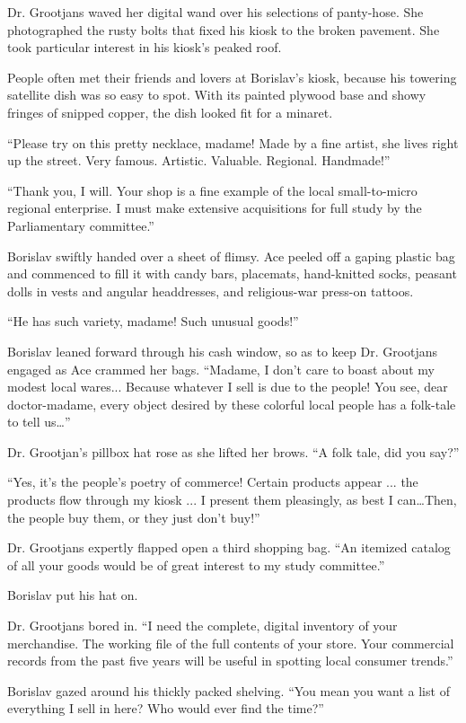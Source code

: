 \documentclass[20 pt,twoside,extrafontsizes,final]{memoir}
\begin{document}
Dr. Grootjans waved her digital wand over his selections of panty-hose. She photographed the rusty bolts that fixed his kiosk to the broken pavement. She took particular interest in his kiosk's peaked roof.

People often met their friends and lovers at Borislav's kiosk, because his towering satellite dish was so easy to spot. With its painted plywood base and showy fringes of snipped copper, the dish looked fit for a minaret.

``Please try on this pretty necklace, madame! Made by a fine artist, she lives right up the street. Very famous. Artistic. Valuable. Regional. Handmade!''

``Thank you, I will. Your shop is a fine example of the local small-to-micro regional enterprise. I must make extensive acquisitions for full study by the Parliamentary committee.''

Borislav swiftly handed over a sheet of flimsy. Ace peeled off a gaping plastic bag and commenced to fill it with candy bars, placemats, hand-knitted socks, peasant dolls in vests and angular headdresses, and religious-war press-on tattoos.

``He has such variety, madame! Such unusual goods!''

Borislav leaned forward through his cash window, so as to keep Dr. Grootjans engaged as Ace crammed her bags. ``Madame, I don't care to boast about my modest local wares... Because whatever I sell is due to the people! You see, dear doctor-madame, every object desired by these colorful local people has a folk-tale to tell us\dots''

Dr. Grootjan's pillbox hat rose as she lifted her brows. ``A folk tale, did you say?''

``Yes, it's the people's poetry of commerce! Certain products appear ... the products flow through my kiosk ... I present them pleasingly, as best I can\dots Then, the people buy them, or they just don't buy!''

Dr. Grootjans expertly flapped open a third shopping bag. ``An itemized catalog of all your goods would be of great interest to my study committee.''

Borislav put his hat on.

Dr. Grootjans bored in. ``I need the complete, digital inventory of your merchandise. The working file of the full contents of your store. Your commercial records from the past five years will be useful in spotting local consumer trends.''

Borislav gazed around his thickly packed shelving. ``You mean you want a list of everything I sell in here? Who would ever find the time?''
\end{document}

